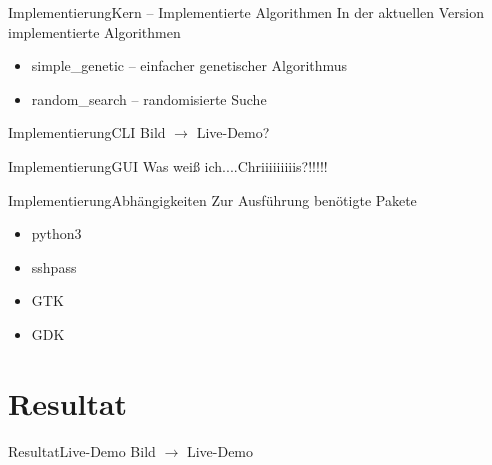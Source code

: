 \documentclass[ngerman,10pt,xcolor=colortbl,compress
]{beamer}
\begin{document}
	\begin{frame}{Implementierung}{Kern -- Implementierte Algorithmen}
	In der aktuellen Version implementierte Algorithmen
	\begin{itemize}
		\item simple\_genetic -- einfacher genetischer Algorithmus
		\item random\_search -- randomisierte Suche
	\end{itemize}
	\end{frame}
	
	\begin{frame}{Implementierung}{CLI}
	Bild $\rightarrow$ Live-Demo?
	\end{frame}

	\begin{frame}{Implementierung}{GUI}
	Was weiß ich....Chriiiiiiiiis?!!!!!
	\end{frame}
	
	\begin{frame}{Implementierung}{Abhängigkeiten}
		Zur Ausführung benötigte Pakete
		\begin{itemize}
			\item python3
			\item sshpass
			\item GTK
			\item GDK
		\end{itemize}
	\end{frame}
	
	\section{Resultat}
	\begin{frame}{Resultat}{Live-Demo}
	Bild $\rightarrow$ Live-Demo
	\end{frame}

	
\end{document}
